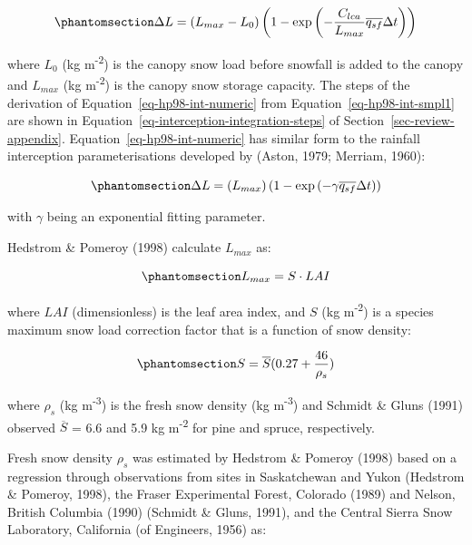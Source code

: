 \documentclass[
  letterpaper,
]{tex/uofsthesis-cs}
\begin{document}
\begin{equation}\phantomsection\label{eq-hp98-int-numeric}{
\Delta L = (L_{max}-L_0)\left(1- \text{exp} \left(-\frac{C_{lca}}{L_{max}} \overline{q_{sf}} \Delta t \right) \right)
}\end{equation}

where \(L_0\) (kg m\textsuperscript{-2}) is the canopy snow load before
snowfall is added to the canopy and \(L_{max}\) (kg
m\textsuperscript{-2}) is the canopy snow storage capacity. The steps of
the derivation of Equation~\ref{eq-hp98-int-numeric} from
Equation~\ref{eq-hp98-int-smpl1} are shown in
Equation~\ref{eq-interception-integration-steps} of
Section~\ref{sec-review-appendix}. Equation~\ref{eq-hp98-int-numeric}
has similar form to the rainfall interception parameterisations
developed by (Aston, 1979; Merriam, 1960):

\begin{equation}\phantomsection\label{eq-merriam-int}{
\Delta L = (L_{max})\left(1- \text{exp} \left(- \gamma \overline{q_{sf}} \Delta t \right) \right)
}\end{equation}

with \(\gamma\) being an exponential fitting parameter.

Hedstrom \& Pomeroy (1998) calculate \(L_{max}\) as:

\begin{equation}\phantomsection\label{eq-l-max}{
L_{max} = S \cdot LAI
}\end{equation}

where \(LAI\) (dimensionless) is the leaf area index, and \(S\) (kg
m\textsuperscript{-2}) is a species maximum snow load correction factor
that is a function of snow density:

\begin{equation}\phantomsection\label{eq-species-correction}{
S = \overline{S} (0.27 + \frac{46}{\rho_s})
}\end{equation}

where \(\rho_s\) (kg m\textsuperscript{-3}) is the fresh snow density
(kg m\textsuperscript{-3}) and Schmidt \& Gluns (1991) observed
\(\overline{S}\) = 6.6 and 5.9 kg m\textsuperscript{-2} for pine and
spruce, respectively.

Fresh snow density \(\rho_s\) was estimated by Hedstrom \& Pomeroy
(1998) based on a regression through observations from sites in
Saskatchewan and Yukon (Hedstrom \& Pomeroy, 1998), the Fraser
Experimental Forest, Colorado (1989) and Nelson, British Columbia (1990)
(Schmidt \& Gluns, 1991), and the Central Sierra Snow Laboratory,
California (of Engineers, 1956) as:
\end{document}
